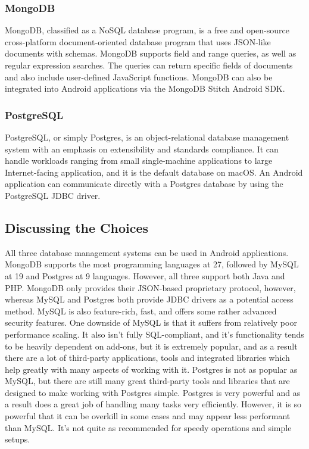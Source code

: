 \documentclass[draftclsnofoot, onecolumn, 10pt, compsoc]{IEEEtran}
\begin{document}
			\subsubsection{\textbf{MongoDB}}
				MongoDB, classified as a NoSQL database program, is a free and open-source cross-platform document-oriented database program that uses JSON-like documents with schemas. MongoDB supports field and range queries, as well as regular expression searches. The queries can return specific fields of documents and also include user-defined JavaScript functions. MongoDB can also be integrated into Android applications via the MongoDB Stitch Android SDK.
				~\cite{wiki:MongoDB}
				~\cite{MongoDB_Android}			
			\subsubsection{\textbf{PostgreSQL}}
				PostgreSQL, or simply Postgres, is an object-relational database management system with an emphasis on extensibility and standards compliance. It can handle workloads ranging from small single-machine applications to large Internet-facing application, and it is the default database on macOS. An Android application can communicate directly with a Postgres database by using the PostgreSQL JDBC driver.
				~\cite{wiki:PostgreSQL}
				~\cite{PostgreSQL_Android}
		
		\subsection{Discussing the Choices}
			All three database management systems can be used in Android applications. MongoDB supports the most programming languages at 27, followed by MySQL at 19 and Postgres at 9 languages. However, all three support both Java and PHP. MongoDB only provides their JSON-based proprietary protocol, however, whereas MySQL and Postgres both provide JDBC drivers as a potential access method. MySQL is also feature-rich, fast, and offers some rather advanced security features. One downside of MySQL is that it suffers from relatively poor performance scaling. It also isn't fully SQL-compliant, and it's functionality tends to be heavily dependent on add-ons, but it is extremely popular, and as a result there are a lot of third-party applications, tools and integrated libraries which help greatly with many aspects of working with it. Postgres is not as popular as MySQL, but there are still many great third-party tools and libraries that are designed to make working with Postgres simple. Postgres is very powerful and as a result does a great job of handling many tasks very efficiently. However, it is so powerful that it can be overkill in some cases and may appear less performant than MySQL. It's not quite as recommended for speedy operations and simple setups.
			~\cite{DB_Comparison}
			~\cite{MySQL_vs_Postgres}
			~\cite{MySQL_Downsides}
			
\end{document}
